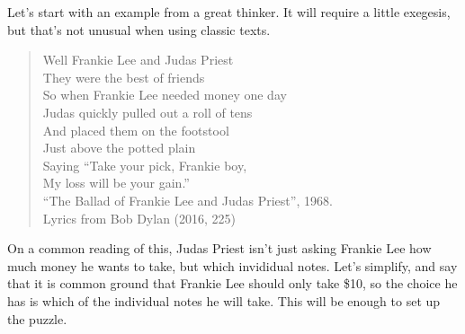 \documentclass[
  12pt,
]{article}
\begin{document}
Let's start with an example from a great thinker. It will require a little exegesis, but that's not unusual when using classic texts.

\begin{quote}
Well Frankie Lee and Judas Priest\\
They were the best of friends\\
So when Frankie Lee needed money one day\\
Judas quickly pulled out a roll of tens\\
And placed them on the footstool\\
Just above the potted plain\\
Saying ``Take your pick, Frankie boy,\\
My loss will be your gain.''\\
\hspace*{0.333em}\hspace*{0.333em}\hspace*{0.333em}\hspace*{0.333em}\hspace*{0.333em}\hspace*{0.333em}\hspace*{0.333em}\hspace*{0.333em}\hspace*{0.333em}\hspace*{0.333em}``The Ballad of Frankie Lee and Judas Priest'', 1968.\\
\hspace*{0.333em}\hspace*{0.333em}\hspace*{0.333em}\hspace*{0.333em}\hspace*{0.333em}\hspace*{0.333em}\hspace*{0.333em}\hspace*{0.333em}\hspace*{0.333em}\hspace*{0.333em}\hspace*{0.333em}Lyrics from Bob Dylan (2016, 225)
\end{quote}

On a common reading of this, Judas Priest isn't just asking Frankie Lee how much money he wants to take, but which invididual notes. Let's simplify, and say that it is common ground that Frankie Lee should only take \$10, so the choice he has is which of the individual notes he will take. This will be enough to set up the puzzle.
\end{document}
